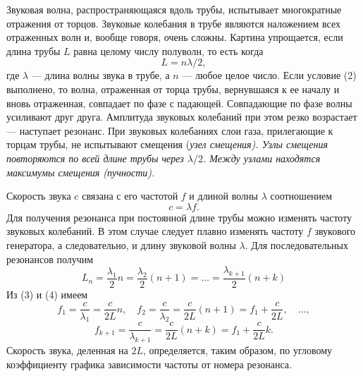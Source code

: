 \documentclass[20pt]{article}
\begin{document}
Звуковая волна, распространяющаяся вдоль трубы, испытывает
многократные отражения от торцов. Звуковые колебания в трубе являются наложением всех отраженных волн и, вообще говоря, очень сложны. Картина упрощается, если длина трубы $L$ равна целому числу полуволн, то есть когда
\begin{equation}
	L = n \lambda/2,
\end{equation}
где $\lambda$ --- длина волны звука в трубе, а $n$ --- любое целое число. Если условие (2) выполнено, то волна, отраженная от торца трубы, вернувшаяся к ее началу и вновь отраженная, совпадает по фазе с падающей. Совпадающие по фазе волны усиливают друг друга. Амплитуда звуковых колебаний при этом резко возрастает --- наступает
резонанс.
При звуковых колебаниях слои газа, прилегающие к торцам трубы, не испытывают смещения (\itshape узел смещения\rm ). Узлы смещения повторяются по всей длине трубы через $\lambda/2$. Между узлами находятся
максимумы смещения (\itshape пучности\rm ).

Скорость звука c связана с его частотой $f$ и длиной волны $\lambda$ соотношением
\begin{equation}
	c = \lambda f.
\end{equation}
Для получения резонанса при постоянной длине трубы можно изменять частоту звуковых колебаний. В этом случае следует плавно изменять частоту $f$
звукового генератора, а следовательно, и длину звуковой волны $\lambda$.
Для последовательных резонансов получим
\begin{equation}
L_n = \frac{\lambda_1}{2}n=\frac{\lambda_2}{2}(n+1) = \ldots = \frac{\lambda_{k+1}}{2}(n+k)
\end{equation}
Из (3) и (4) имеем
\[
	f_1 = \frac{c}{\lambda_1} = \frac{c}{2L}n, \quad f_2 = \frac{c}{\lambda_2} = \frac{c}{2L}(n+1) = f_1 + \frac{c}{2L},\quad \ldots,
\]
\begin{equation}
f_{k+1} = \frac{c}{\lambda_{k+1}} = \frac{c}{2L}(n+k)= f_1 + \frac{c}{2L}k.
\end{equation}
Скорость звука, деленная на $2L$, определяется, таким образом,
по угловому коэффициенту графика зависимости частоты от номера
резонанса.
\end{document}
